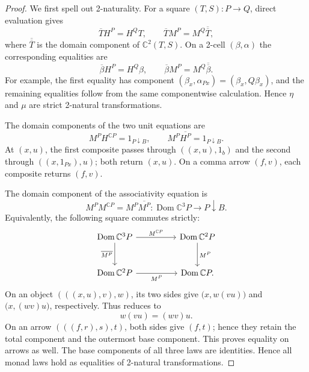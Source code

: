 \documentclass[11pt]{article}
\theoremstyle{plain}
\theoremstyle{definition}
\theoremstyle{remark}
\newcommand{\Dom}{\operatorname{Dom}}
\newcommand{\C}{\mathbb{C}}
\numberwithin{equation}{section}
\begin{document}
\begin{proof}
We first spell out 2-naturality.  For a square
$(T,S)\colon P\to Q$, direct evaluation gives
\begin{equation*}
  \overline T H^{P}=H^{Q}T,
  \qquad
  \overline T M^{P}=M^{Q}\overline{\overline T},
\end{equation*}
where $\overline{\overline T}$ is the domain component of
$\C^{2}(T,S)$.  On a 2-cell $(\beta,\alpha)$ the corresponding
equalities are
\begin{equation*}
  \overline\beta H^{P}=H^{Q}\beta,
  \qquad
  \overline\beta M^{P}=M^{Q}\overline{\overline\beta}.
\end{equation*}
For example, the first equality has component
$(\beta_x,\alpha_{Px})=(\beta_x,Q\beta_x)$, and the remaining
equalities follow from the same componentwise calculation.  Hence
$\eta$ and $\mu$ are strict 2-natural transformations.

The domain components of the two unit equations are
\begin{equation}
  M^{P}H^{\C P}=1_{P\downarrow B},
  \qquad
  M^{P}\overline{H^{P}}=1_{P\downarrow B}.
  \label{eq:comma-unit-laws}
\end{equation}
At $(x,u)$, the first composite passes through
$((x,u),1_b)$ and the second through $((x,1_{Px}),u)$; both return
$(x,u)$.  On a comma arrow $(f,v)$, each composite returns $(f,v)$.

The domain component of the associativity equation is
\begin{equation}
  M^{P}M^{\C P}=M^{P}\overline{M^{P}}
  \colon\Dom\C^{3}P\longrightarrow P\!\downarrow\!B.
  \label{eq:comma-associativity}
\end{equation}
Equivalently, the following square commutes strictly:
\begin{equation*}
\begin{tikzcd}[column sep=huge,row sep=large]
\Dom\C^3P \arrow[r,"M^{\C P}"]
  \arrow[d,"{\overline{M^P}}"']
& \Dom\C^2P \arrow[d,"M^P"] \\
\Dom\C^2P \arrow[r,"M^P"']
& \Dom\C P .
\end{tikzcd}
\end{equation*}
On an object $(((x,u),v),w)$, its two sides give
$\bigl(x,w(vu)\bigr)$ and $\bigl(x,(wv)u\bigr)$, respectively.
Thus  reduces to
\begin{equation*}
w(vu)=(wv)u.
\end{equation*}
On an arrow $(((f,r),s),t)$, both sides give $(f,t)$; hence they retain
the total component and the outermost base component.  This proves
equality on arrows as well.
The base components of all three laws are identities.  Hence all monad
laws hold as equalities of 2-natural transformations.
\end{proof}
\end{document}
